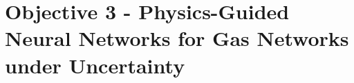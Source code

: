 \documentclass[hyperref={colorlinks,citecolor=blue,linkcolor=blue,urlcolor=blue}]{beamer}
\begin{document}
%
%
%


\section{Objective 3 - Physics-Guided Neural Networks for Gas Networks under Uncertainty}
\end{document}
